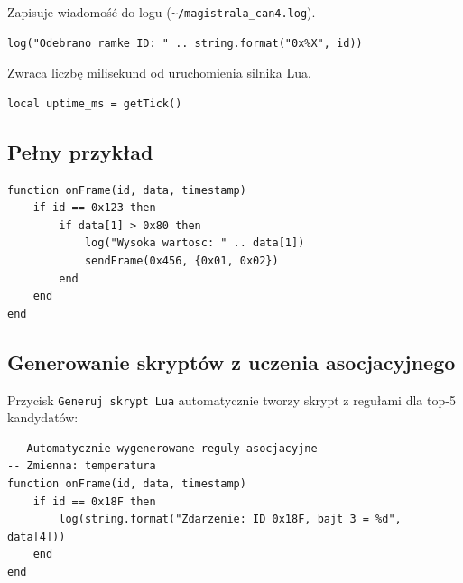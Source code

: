 \documentclass[a4paper,12pt]{article}
\begin{document}
\begin{tcolorbox}[colback=darkbg, colframe=pink, title={\color{pink}\textbf{log(message)}}, arc=4pt]
Zapisuje wiadomość do logu (\texttt{\textasciitilde/magistrala\_can4.log}).
\begin{lstlisting}[style=luastyle, frame=none, backgroundcolor=\color{darkbg}]
log("Odebrano ramke ID: " .. string.format("0x%X", id))
\end{lstlisting}
\end{tcolorbox}

\begin{tcolorbox}[colback=darkbg, colframe=orange, title={\color{orange}\textbf{getTick()}}, arc=4pt]
Zwraca liczbę milisekund od uruchomienia silnika Lua.
\begin{lstlisting}[style=luastyle, frame=none, backgroundcolor=\color{darkbg}]
local uptime_ms = getTick()
\end{lstlisting}
\end{tcolorbox}

\subsection{Pełny przykład}

\begin{lstlisting}[style=luastyle, caption={Monitorowanie ID 0x123 z automatyczną odpowiedzią}]
function onFrame(id, data, timestamp)
    if id == 0x123 then
        if data[1] > 0x80 then
            log("Wysoka wartosc: " .. data[1])
            sendFrame(0x456, {0x01, 0x02})
        end
    end
end
\end{lstlisting}

\subsection{Generowanie skryptów z uczenia asocjacyjnego}

Przycisk \texttt{Generuj skrypt Lua} automatycznie tworzy skrypt z regułami dla top-5 kandydatów:

\begin{lstlisting}[style=luastyle, caption={Automatycznie wygenerowany skrypt}]
-- Automatycznie wygenerowane reguly asocjacyjne
-- Zmienna: temperatura
function onFrame(id, data, timestamp)
    if id == 0x18F then
        log(string.format("Zdarzenie: ID 0x18F, bajt 3 = %d", data[4]))
    end
end
\end{lstlisting}

\end{document}
